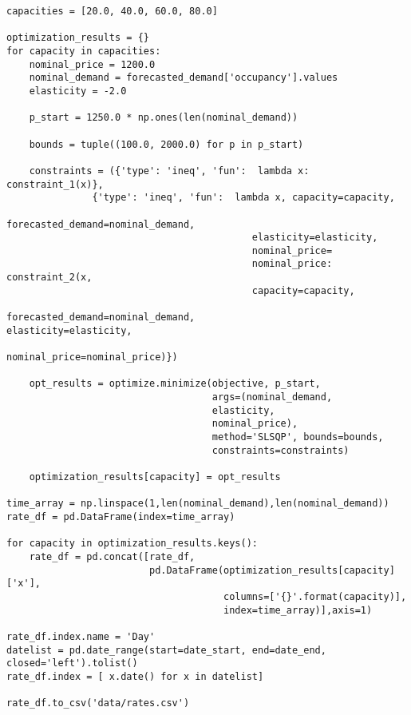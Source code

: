\begin{verbatim}
capacities = [20.0, 40.0, 60.0, 80.0]

optimization_results = {}
for capacity in capacities:
    nominal_price = 1200.0
    nominal_demand = forecasted_demand['occupancy'].values
    elasticity = -2.0

    p_start = 1250.0 * np.ones(len(nominal_demand))

    bounds = tuple((100.0, 2000.0) for p in p_start)

    constraints = ({'type': 'ineq', 'fun':  lambda x:  constraint_1(x)},
               {'type': 'ineq', 'fun':  lambda x, capacity=capacity,
                                           forecasted_demand=nominal_demand,
                                           elasticity=elasticity,
                                           nominal_price=
                                           nominal_price: constraint_2(x,
                                           capacity=capacity,
                                           forecasted_demand=nominal_demand,                                                           elasticity=elasticity,
                                           nominal_price=nominal_price)})

    opt_results = optimize.minimize(objective, p_start,
                                    args=(nominal_demand,
                                    elasticity,
                                    nominal_price),
                                    method='SLSQP', bounds=bounds,
                                    constraints=constraints)

    optimization_results[capacity] = opt_results

time_array = np.linspace(1,len(nominal_demand),len(nominal_demand))
rate_df = pd.DataFrame(index=time_array)

for capacity in optimization_results.keys():
    rate_df = pd.concat([rate_df,
                         pd.DataFrame(optimization_results[capacity]['x'],
                                      columns=['{}'.format(capacity)],
                                      index=time_array)],axis=1)

rate_df.index.name = 'Day'
datelist = pd.date_range(start=date_start, end=date_end, closed='left').tolist()
rate_df.index = [ x.date() for x in datelist]

rate_df.to_csv('data/rates.csv')


\end{verbatim}
